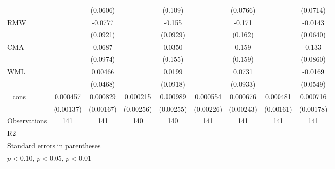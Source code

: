 \begin{table}[htbp]
\begin{tabular}{l*{8}{c}}
                    &                     &    (0.0606)         &                     &     (0.109)         &                     &    (0.0766)         &                     &    (0.0714)         \\
RMW                 &                     &     -0.0777         &                     &      -0.155\sym{*}  &                     &      -0.171         &                     &     -0.0143         \\
                    &                     &    (0.0921)         &                     &    (0.0929)         &                     &     (0.162)         &                     &    (0.0640)         \\
CMA                 &                     &      0.0687         &                     &      0.0350         &                     &       0.159         &                     &       0.133         \\
                    &                     &    (0.0974)         &                     &     (0.155)         &                     &     (0.159)         &                     &    (0.0860)         \\
WML                 &                     &     0.00466         &                     &      0.0199         &                     &      0.0731         &                     &     -0.0169         \\
                    &                     &    (0.0468)         &                     &    (0.0918)         &                     &    (0.0933)         &                     &    (0.0549)         \\
\_cons              &    0.000457         &    0.000829         &    0.000215         &    0.000989         &    0.000554         &    0.000676         &    0.000481         &    0.000716         \\
                    &   (0.00137)         &   (0.00167)         &   (0.00256)         &   (0.00255)         &   (0.00226)         &   (0.00243)         &   (0.00161)         &   (0.00178)         \\
\hline
Observations        &         141         &         141         &         140         &         140         &         141         &         141         &         141         &         141         \\
R2                  &                     &                     &                     &                     &                     &                     &                     &                     \\
\hline\hline
\multicolumn{9}{l}{\footnotesize Standard errors in parentheses}\\
\multicolumn{9}{l}{\footnotesize \sym{*} \(p<0.10\), \sym{**} \(p<0.05\), \sym{***} \(p<0.01\)}\\
\end{tabular}
\end{table}
